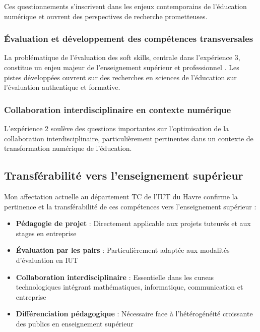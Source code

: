 Ces questionnements s'inscrivent dans les enjeux contemporains de l'éducation numérique \parencite{intelligence_artificielle_education,luckin_ai_education} et ouvrent des perspectives de recherche prometteuses.

\subsubsection{Évaluation et développement des compétences transversales}

La problématique de l'évaluation des soft skills, centrale dans l'expérience 3, constitue un enjeu majeur de l'enseignement supérieur et professionnel \parencite{competences_transversales_eurecia,competences_21_siecle}. Les pistes développées ouvrent sur des recherches en sciences de l'éducation sur l'évaluation authentique et formative.

\subsubsection{Collaboration interdisciplinaire en contexte numérique}

L'expérience 2 soulève des questions importantes sur l'optimisation de la collaboration interdisciplinaire, particulièrement pertinentes dans un contexte de transformation numérique de l'éducation.

\subsection{Transférabilité vers l'enseignement supérieur}

Mon affectation actuelle au département TC de l'IUT du Havre confirme la pertinence et la transférabilité de ces compétences vers l'enseignement supérieur :

\begin{itemize}[leftmargin=*]
    \item \textbf{Pédagogie de projet} : Directement applicable aux projets tuteurés et aux stages en entreprise
    \item \textbf{Évaluation par les pairs} : Particulièrement adaptée aux modalités d'évaluation en IUT
    \item \textbf{Collaboration interdisciplinaire} : Essentielle dans les cursus technologiques intégrant mathématiques, informatique, communication et entreprise
    \item \textbf{Différenciation pédagogique} : Nécessaire face à l'hétérogénéité croissante des publics en enseignement supérieur
\end{itemize}

